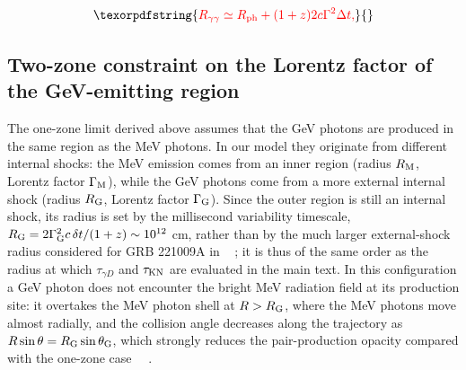 \documentclass[prd,twocolumn,amsmath,amssymb,aps,linenumbers]{revtex4-2} %
\providecommand{\DIFaddtex}[1]{{\protect\color{blue} \sf #1}} %
\providecommand{\DIFdeltex}[1]{{\protect\color{red} \scriptsize #1}} %
\providecommand{\DIFaddbegin}{} %
\providecommand{\DIFdelbegin}{} %
\providecommand{\DIFdelend}{} %
\providecommand{\DIFadd}[1]{\texorpdfstring{\DIFaddtex{#1}}{#1}} %
\providecommand{\DIFdel}[1]{\texorpdfstring{\DIFdeltex{#1}}{}} %
\newcommand{\DIFscaledelfig}{0.5}
\newlength{\DIFdelgraphicswidth} %
\newlength{\DIFdelgraphicsheight} %
\newcommand{\DIFaddincludegraphics}[2][]{{\color{blue}\fbox{\DIFOincludegraphics[#1]{#2}}}} %
\newcommand{\DIFdelincludegraphics}[2][]{%
\sbox{\DIFdelgraphicsbox}{\DIFOincludegraphics[#1]{#2}}%
\settoboxwidth{\DIFdelgraphicswidth}{\DIFdelgraphicsbox} %
\settoboxtotalheight{\DIFdelgraphicsheight}{\DIFdelgraphicsbox} %
\scalebox{\DIFscaledelfig}{%
\parbox[b]{\DIFdelgraphicswidth}{\usebox{\DIFdelgraphicsbox}\\[-\baselineskip] \rule{\DIFdelgraphicswidth}{0em}}\llap{\resizebox{\DIFdelgraphicswidth}{\DIFdelgraphicsheight}{%
\setlength{\unitlength}{\DIFdelgraphicswidth}%
\begin{picture}(1,1)%
\thicklines\linethickness{2pt} %
{\color[rgb]{1,0,0}\put(0,0){\framebox(1,1){}}}%
{\color[rgb]{1,0,0}\put(0,0){\line( 1,1){1}}}%
{\color[rgb]{1,0,0}\put(0,1){\line(1,-1){1}}}%
\end{picture}%
}\hspace*{3pt}}} %
} %
\DeclareRobustCommand{\DIFaddbegin}{\DIFOaddbegin \let\includegraphics\DIFaddincludegraphics} %
\DeclareRobustCommand{\DIFdelbegin}{\DIFOdelbegin \let\includegraphics\DIFdelincludegraphics} %
\DeclareRobustCommand{\DIFdelend}{\DIFOaddend \let\includegraphics\DIFOincludegraphics} %
\begin{document}
\DIFdelbegin \begin{displaymath}\DIFdel{%
   R_{\gamma\gamma}\simeq R_{\rm ph} +(1+z)2c\Gamma^2\Delta t,
}\end{displaymath}%
\DIFdelend \DIFaddbegin \subsection{\DIFadd{Two-zone constraint on the Lorentz factor of the GeV-emitting region}}
\label{sec:twozone}
\DIFadd{The one-zone limit derived above assumes that the GeV photons are produced in the same region as the MeV photons. In our model they originate from different internal shocks: the MeV emission comes from an inner region (radius $R_{\rm M}$, Lorentz factor $\Gamma_{\rm M}$), while the GeV photons come from a more external internal shock (radius $R_{\rm G}$, Lorentz factor $\Gamma_{\rm G}$). Since the outer region is still an internal shock, its radius is set by the millisecond variability timescale, $R_{\rm G}=2\Gamma_{\rm G}^{2}c\,\delta t/(1+z)\sim10^{12}$ cm, rather than by the much larger external-shock radius considered for GRB 221009A in \mbox{%
\cite{2023ApJ...956L..38G}}\hskip0pt%
; it is thus of the same order as the radius at which $\tau_{\gamma D}$ and $\tau_{\rm KN}$ are evaluated in the main text. In this configuration a GeV photon does not encounter the bright MeV radiation field at its production site: it overtakes the MeV photon shell at $R>R_{\rm G}$, where the MeV photons move almost radially, and the collision angle decreases along the trajectory as $R\sin\theta=R_{\rm G}\sin\theta_{\rm G}$, which strongly reduces the pair-production opacity compared with the one-zone case~\mbox{%
\citep{2011ApJ...726L...2Z,2023ApJ...956L..38G}}\hskip0pt%
.
}
\end{document}
